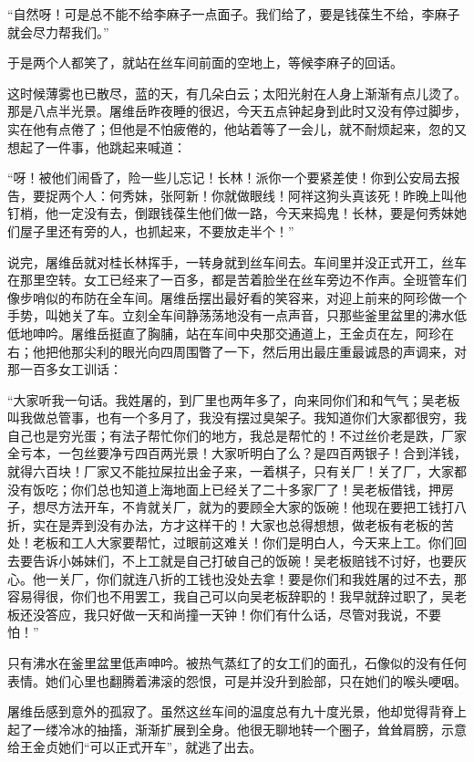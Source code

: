 \par “自然呀！可是总不能不给李麻子一点面子。我们给了，要是钱葆生不给，李麻子就会尽力帮我们。”
\par 于是两个人都笑了，就站在丝车间前面的空地上，等候李麻子的回话。
\par 这时候薄雾也已散尽，蓝的天，有几朵白云；太阳光射在人身上渐渐有点儿烫了。那是八点半光景。屠维岳昨夜睡的很迟，今天五点钟起身到此时又没有停过脚步，实在他有点倦了；但他是不怕疲倦的，他站着等了一会儿，就不耐烦起来，忽的又想起了一件事，他跳起来喊道：
\par “呀！被他们闹昏了，险一些儿忘记！长林！派你一个要紧差使！你到公安局去报告，要捉两个人：何秀妹，张阿新！你就做眼线！阿祥这狗头真该死！昨晚上叫他钉梢，他一定没有去，倒跟钱葆生他们做一路，今天来捣鬼！长林，要是何秀妹她们屋子里还有旁的人，也抓起来，不要放走半个！”
\par 说完，屠维岳就对桂长林挥手，一转身就到丝车间去。车间里并没正式开工，丝车在那里空转。女工已经来了一百多，都是苦着脸坐在丝车旁边不作声。全班管车们像步哨似的布防在全车间。屠维岳摆出最好看的笑容来，对迎上前来的阿珍做一个手势，叫她关了车。立刻全车间静荡荡地没有一点声音，只那些釜里盆里的沸水低低地呻吟。屠维岳挺直了胸脯，站在车间中央那交通道上，王金贞在左，阿珍在右；他把他那尖利的眼光向四周围瞥了一下，然后用出最庄重最诚恳的声调来，对那一百多女工训话：
\par “大家听我一句话。我姓屠的，到厂里也两年多了，向来同你们和和气气；吴老板叫我做总管事，也有一个多月了，我没有摆过臭架子。我知道你们大家都很穷，我自己也是穷光蛋；有法子帮忙你们的地方，我总是帮忙的！不过丝价老是跌，厂家全亏本，一包丝要净亏四百两光景！大家听明白了么？是四百两银子！合到洋钱，就得六百块！厂家又不能拉屎拉出金子来，一着棋子，只有关厂！关了厂，大家都没有饭吃；你们总也知道上海地面上已经关了二十多家厂了！吴老板借钱，押房子，想尽方法开车，不肯就关厂，就为的要顾全大家的饭碗！他现在要把工钱打八折，实在是弄到没有办法，方才这样干的！大家也总得想想，做老板有老板的苦处！老板和工人大家要帮忙，过眼前这难关！你们是明白人，今天来上工。你们回去要告诉小姊妹们，不上工就是自己打破自己的饭碗！吴老板赔钱不讨好，也要灰心。他一关厂，你们就连八折的工钱也没处去拿！要是你们和我姓屠的过不去，那容易得很，你们也不用罢工，我自己可以向吴老板辞职的！我早就辞过职了，吴老板还没答应，我只好做一天和尚撞一天钟！你们有什么话，尽管对我说，不要怕！”
\par 只有沸水在釜里盆里低声呻吟。被热气蒸红了的女工们的面孔，石像似的没有任何表情。她们心里也翻腾着沸滚的怨恨，可是并没升到脸部，只在她们的喉头哽咽。
\par 屠维岳感到意外的孤寂了。虽然这丝车间的温度总有九十度光景，他却觉得背脊上起了一缕冷冰的抽搐，渐渐扩展到全身。他很无聊地转一个圈子，耸耸肩膀，示意给王金贞她们“可以正式开车”，就逃了出去。
